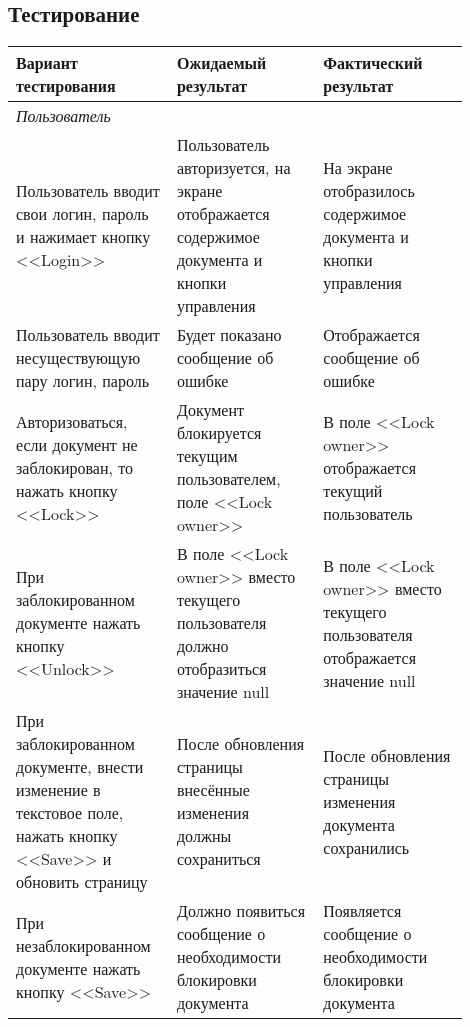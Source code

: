 \subsection{Тестирование}
\begin{center}
	\begin{longtable}{|p{0.3\linewidth}|p{0.3\linewidth}|p{0.3\linewidth}|}
		\hline
		\textbf{Вариант тестирования} & \textbf{Ожидаемый результат}&
		\textbf{Фактический результат}\\
		\hline
		\multicolumn{3}{|p{0.3\linewidth}|}{\textit{Пользователь}} \\
		\hline
		Пользователь вводит свои логин, пароль и нажимает кнопку <<Login>> & Пользователь авторизуется, на экране отображается содержимое документа и кнопки управления & На экране отобразилось содержимое документа и кнопки управления  \\
		\hline
		Пользователь вводит несуществующую пару логин, пароль & Будет показано сообщение об ошибке & Отображается сообщение об ошибке \\
		\hline
	Авторизоваться, если документ не заблокирован, то нажать кнопку <<Lock>> & Документ блокируется текущим пользователем, поле <<Lock owner>> & 
		В поле <<Lock owner>> отображается текущий пользователь \\
		\hline
		При заблокированном документе нажать кнопку <<Unlock>>
		& В поле <<Lock owner>> вместо текущего пользователя должно отобразиться значение null & В поле <<Lock owner>> вместо текущего пользователя отображается значение null \\
		\hline
		При заблокированном документе, внести изменение в текстовое поле, нажать кнопку <<Save>> и обновить страницу
		& После обновления страницы внесённые изменения должны сохраниться & После обновления страницы изменения документа сохранились \\
		\hline
		При незаблокированном документе нажать кнопку <<Save>>
		& Должно появиться сообщение о необходимости блокировки документа & Появляется сообщение о необходимости блокировки документа \\ \hline
		
	\end{longtable}
\end{center}